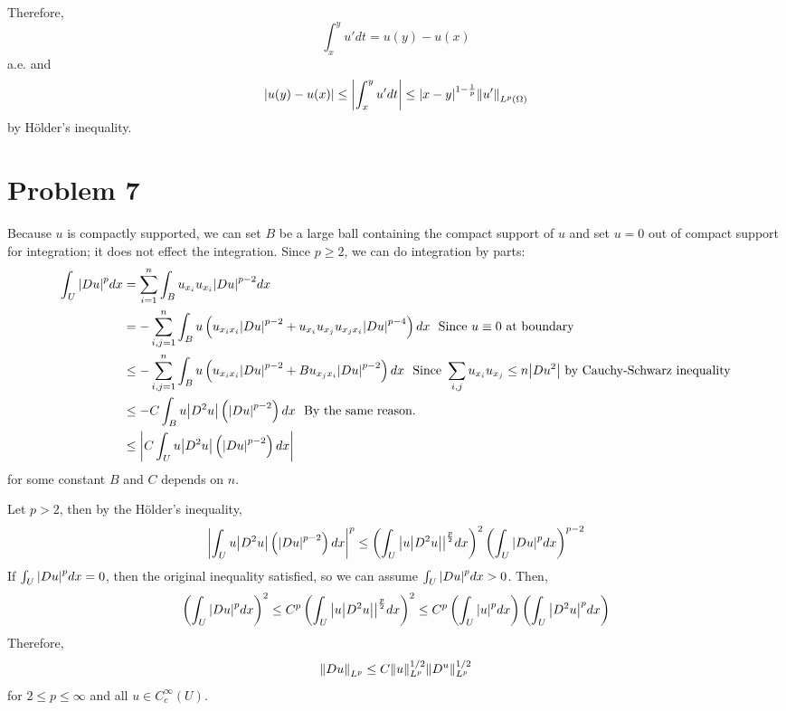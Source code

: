 \documentclass{article}
\begin{document}
Therefore,
\begin{equation*}
\int_x^y u' dt = u(y) - u(x)
\end{equation*}
a.e. and
\begin{equation*}
\abs{u(y)-u(x)}\leq \abs{\int_x^y u' dt} \leq \abs{x-y}^{1-\frac{1}{p}}\norm{u'}_{L^p(\Omega)}
\end{equation*}
by H\"older's inequality.
\section*{Problem 7}
Because $u$ is compactly supported, we can set $B$ be a large ball containing the compact support of $u$ and set $u=0$ out of compact support for integration; it does not effect the integration. Since $p\geq 2$, we can do integration by parts:
\begin{equation*}
\begin{split}
\int_U \abs{Du}^p dx&=\sum\limits_{i=1}^n \int_B u_{x_i} u_{x_i} \abs{Du}^{p-2}dx \\
&=-\sum\limits_{i,j=1}^n \int_B u \left(u_{x_ix_i}\abs{Du}^{p-2}+u_{x_i}u_{x_j}u_{x_jx_i}\abs{Du}^{p-4}\right)dx ~\text{ Since }u\equiv 0\text{ at boundary}\\
&\leq-\sum\limits_{i,j=1}^n \int_B u \left(u_{x_ix_i}\abs{Du}^{p-2}+Bu_{x_jx_i}\abs{Du}^{p-2}\right)dx~\text{ Since }\sum_{i,j} u_{x_i}u_{x_j}\leq n\abs{Du^2}\text{ by Cauchy-Schwarz inequality} \\
&\leq -C\int_B u \abs{D^2u}\left(\abs{Du}^{p-2}\right)dx~\text{ By the same reason}. \\
&\leq \abs{C\int_U u \abs{D^2u}\left(\abs{Du}^{p-2}\right)dx}
\end{split}
\end{equation*}
for some constant $B$ and $C$ depends on $n$.

Let $p>2$, then by the H\"older's inequality, 
\begin{equation*}
\abs{\int_U u \abs{D^2u}\left(\abs{Du}^{p-2}\right)dx}^p\leq \left(\int_U \abs{u\abs{D^2u}}^{\frac{p}{2}} dx\right)^2\left(\int_U \abs{Du}^{p} dx\right)^{p-2}
\end{equation*}
If $\int_U \abs{Du}^{p} dx=0$, then the original inequality satisfied, so we can assume $\int_U \abs{Du}^{p} dx>0$. Then,
\begin{equation*}
\left(\int_U \abs{Du}^{p} dx\right)^2\leq C^p\left(\int_U \abs{u\abs{D^2u}}^{\frac{p}{2}} dx\right)^2\leq C^p\left(\int_U \abs{u}^p dx\right) \left(\int_U \abs{D^2 u}^p dx\right)
\end{equation*}
Therefore, 
\begin{equation*}
\norm{Du}_{L^p}\leq C\norm{u}_{L^p}^{1/2}\norm{D^u}_{L^p}^{1/2}
\end{equation*}
for $2\leq p\leq \infty $ and all $u\in C^\infty_c(U)$.
\end{document}
